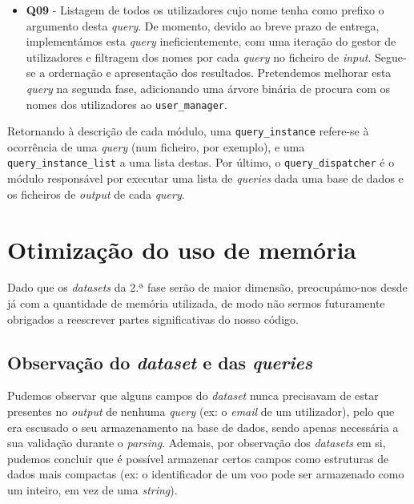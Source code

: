 \documentclass[12pt, a4paper]{article}
\begin{document}
\begin{itemize}
    \item \textbf{Q09} - Listagem de todos os utilizadores cujo nome tenha como prefixo o argumento
                         desta \emph{query}. De momento, devido ao breve prazo de entrega,
                         implementámos esta \emph{query} ineficientemente, com uma iteração do
                         gestor de utilizadores e filtragem dos nomes por cada \emph{query} no
                         ficheiro de \emph{input}. Segue-se a ordernação e apresentação dos
                         resultados. Pretendemos melhorar esta \emph{query} na segunda fase,
                         adicionando uma árvore binária de procura com os nomes dos utilizadores
                         ao \texttt{user\_manager}.
\end{itemize}

Retornando à descrição de cada módulo, uma \texttt{query\_instance} refere-se à ocorrência de uma
\emph{query} (num ficheiro, por exemplo), e uma \texttt{query\_instance\_list} a uma lista destas.
Por último, o \texttt{query\_dispatcher} é o módulo responsável por executar uma lista de
\emph{queries} dada uma base de dados e os ficheiros de \emph{output} de cada \emph{query}.

\section{Otimização do uso de memória}

Dado que os \emph{datasets} da 2.ª fase serão de maior dimensão, preocupámo-nos desde já com a
quantidade de memória utilizada, de modo não sermos futuramente obrigados a reescrever partes
significativas do nosso código.

\subsection{Observação do \emph{dataset} e das \emph{queries}}

Pudemos observar que alguns campos do \emph{dataset} nunca precisavam de estar presentes no
\emph{output} de nenhuma \emph{query} (ex: o \emph{email} de um utilizador), pelo que era escusado
o seu armazenamento na base de dados, sendo apenas necessária a sua validação durante o
\emph{parsing}. Ademais, por observação dos \emph{datasets} em si, pudemos concluir que é possível
armazenar certos campos como estruturas de dados mais compactas (ex: o identificador de um voo
pode ser armazenado como um inteiro, em vez de uma \emph{string}).
\end{document}
